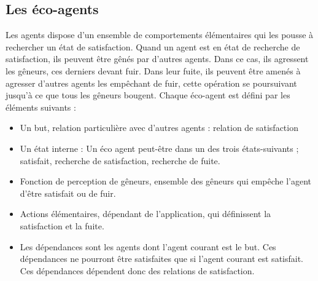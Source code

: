 	\subsection{Les éco-agents}
		Les agents dispose d'un ensemble de comportements élémentaires qui les pousse à rechercher un état de satisfaction. Quand un agent est en état de recherche de satisfaction, ils peuvent être gênés par d'autres agents. Dans ce cas, ils agressent les gêneurs, ces derniers devant fuir.  Dans leur fuite, ils peuvent être amenés à agresser d'autres agents les empêchant de fuir, cette opération se poursuivant jusqu'à ce que tous les gêneurs bougent. 
		Chaque éco-agent est défini par les éléments suivants : 
		\begin{itemize}
		\item Un but, relation particulière avec d'autres agents : relation de satisfaction 
		\item Un état interne :  Un éco agent peut-être dans un des trois états-suivants ; satisfait, recherche de satisfaction, recherche de fuite. 
		\item Fonction de perception de gêneurs, ensemble des gêneurs qui empêche l'agent d'être satisfait ou de fuir. 
		\item Actions élémentaires, dépendant de l'application, qui définissent la satisfaction et la fuite. 
		\item Les dépendances sont les agents dont l'agent courant est le but. Ces dépendances ne pourront être satisfaites que si l'agent courant est satisfait. Ces dépendances dépendent donc des relations de satisfaction.
		\end{itemize}
		
